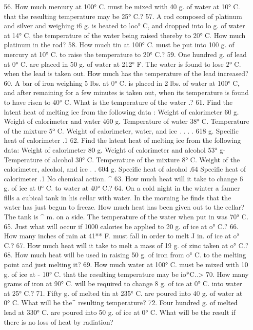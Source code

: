 56. How much mercury at 100° C. must be mixed with 40 g. of water at 10° C. that the resulting temperature may be 25° C.?
57. A rod composed of platinum and silver and weighing i6 g. is heated to loo° C, and dropped into lo g. of water at 14° C, the temperature of the water being raised thereby to 20° C. How much platinum in the rod?
58. How much tin at 100° C. must be put into 100 g. of mercury at 10° C. to raise the temperature to 20° C.?
59. One hundred g. of lead at 0° C. are placed in 50 g. of water at 212° F. The water is found to lose 2° C. when the lead is taken out. How much has the temperature of the lead increased?
60. A bar of iron weighing 5 lbs. at 0° C. is placed in 2 lbs. of water at 100° C, and after remaining for a few minutes is taken out, when its temperature is found to have risen to 40° C. What is the temperature of the water .?
61. Find the latent heat of melting ice from the following data :
Weight of calorimeter 60 g.
Weight of calorimeter and water 460 g.
Temperature of water 38° C.
Temperature of the mixture 5° C.
Weight of calorimeter, water, and ice . . . . 618 g.
Specific heat of calorimeter .1
62. Find the latent heat of melting ice from the following data:
Weight of calorimeter 80 g.
Weight of calorimeter and alcohol 53° g-
Temperature of alcohol 30° C.
Temperature of the mixture 8° C.
Weight of the calorimeter, alcohol, and ice . . 604 g.
Specific heat of alcohol .64
Specific heat of calorimeter .1
No chemical action. ^
63. How much heat will it take to change 6 g. of ice at 0° C. to water at 40° C.?
64. On a cold night in the winter a fanner fills a cubical tank in his cellar with water. In the morning he finds that the water has just begun to freeze. How much heat has been given out to the cellar? The tank is ^ m. on a side. The temperature of the water when put in was 70° C.
65. Just what will occur if 1000 calories be applied to 20 g. of ice at o° C.?
66. How many inches of rain at 41** F. must fall in order to melt J in. of ice at o° C.?
67. How much heat will it take to melt a mass of 19 g. of zinc taken at o° C.?
68. How much heat will be used in raising 50 g. of iron from o° C. to the melting point and just melting it?
69. How much water at 100° C. must be mixed with 10 g. of ice at - 10° C. that the resulting temperature may be io*C..>
70. How many grams of iron at 90° C. will be required to change 8 g. of ice at 0° C. into water at 25° C.?
71. Fifty g. of melted tin at 235° C. are poured into 40 g. of water at 0° C. What will be the^ resulting temperature?
72. Four hundred g. of melted lead at 330° C. are poured into 50 g. of ice at 0° C. What will be the result if there is no loss of heat by radiation?
